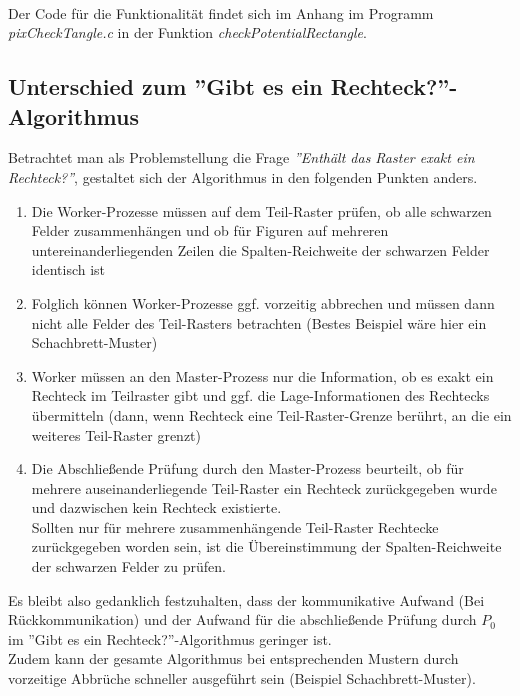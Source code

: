 \documentclass[
10pt, %
a4paper, %
oneside, %
headinclude,footinclude, %
BCOR5mm, %
]{scrartcl}
\begin{document}
\begin{algorithm}[H]
{{		}
	}
\end{algorithm}\

Der Code für die Funktionalität findet sich im Anhang im Programm \textit{pixCheckTangle.c} in der Funktion \textit{checkPotentialRectangle}.

\subsection{Unterschied zum ''Gibt es ein Rechteck?''-Algorithmus}

Betrachtet man als Problemstellung die Frage \textit{''Enthält das Raster exakt ein Rechteck?''}, gestaltet sich der Algorithmus in den folgenden Punkten anders.

\begin{enumerate}[noitemsep]
	\item Die Worker-Prozesse müssen auf dem Teil-Raster prüfen, ob alle schwarzen Felder zusammenhängen und ob für Figuren auf mehreren untereinanderliegenden Zeilen die Spalten-Reichweite der schwarzen Felder identisch ist
	\item Folglich können Worker-Prozesse ggf. vorzeitig abbrechen und müssen dann nicht alle Felder des Teil-Rasters betrachten (Bestes Beispiel wäre hier ein Schachbrett-Muster)
	\item Worker müssen an den Master-Prozess nur die Information, ob es exakt ein Rechteck im Teilraster gibt und ggf. die Lage-Informationen des Rechtecks übermitteln (dann, wenn Rechteck eine Teil-Raster-Grenze berührt, an die ein weiteres Teil-Raster grenzt)
	\item Die Abschließende Prüfung durch den Master-Prozess beurteilt, ob für mehrere auseinanderliegende Teil-Raster ein Rechteck zurückgegeben wurde und dazwischen kein Rechteck existierte.\\ Sollten nur für mehrere zusammenhängende Teil-Raster Rechtecke zurückgegeben worden sein, ist die Übereinstimmung der Spalten-Reichweite der schwarzen Felder zu prüfen.
\end{enumerate}

Es bleibt also gedanklich festzuhalten, dass der kommunikative Aufwand (Bei Rückkommunikation) und der Aufwand für die abschließende Prüfung durch \(P_0\) im ''Gibt es ein Rechteck?''-Algorithmus geringer ist.\\
Zudem kann der gesamte Algorithmus bei entsprechenden Mustern durch vorzeitige Abbrüche schneller ausgeführt sein (Beispiel Schachbrett-Muster).
\end{document}
